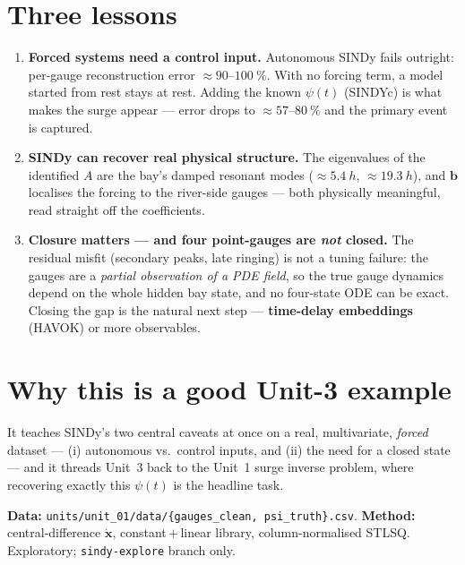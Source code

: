 \documentclass[11pt]{article}
\begin{document}
\section*{Three lessons}

\begin{enumerate}\itemsep2pt
  \item \textbf{Forced systems need a control input.} Autonomous SINDy fails
        outright: per-gauge reconstruction error $\approx 90$--$\SI{100}{\percent}$.
        With no forcing term, a model started from rest stays at rest. Adding the
        known $\psi(t)$ (SINDYc) is what makes the surge appear --- error drops to
        $\approx 57$--$\SI{80}{\percent}$ and the primary event is captured.
  \item \textbf{SINDy can recover real physical structure.} The eigenvalues of the
        identified $A$ are the bay's damped resonant modes ($\approx\SI{5.4}{h}$,
        $\approx\SI{19.3}{h}$), and $\mathbf{b}$ localises the forcing to the
        river-side gauges --- both physically meaningful, read straight off the
        coefficients.
  \item \textbf{Closure matters --- and four point-gauges are \emph{not} closed.}
        The residual misfit (secondary peaks, late ringing) is not a tuning
        failure: the gauges are a \emph{partial observation of a PDE field}, so the
        true gauge dynamics depend on the whole hidden bay state, and no
        four-state ODE can be exact. Closing the gap is the natural next step ---
        \textbf{time-delay embeddings} (HAVOK) or more observables.
\end{enumerate}

\section*{Why this is a good Unit-3 example}

It teaches SINDy's two central caveats at once on a real, multivariate,
\emph{forced} dataset --- (i) autonomous vs.\ control inputs, and (ii) the need for
a closed state --- and it threads Unit~3 back to the Unit~1 surge inverse problem,
where recovering exactly this $\psi(t)$ is the headline task.

\vspace{0.4cm}
\footnotesize\noindent\textbf{Data:} \texttt{units/unit\_01/data/\{gauges\_clean,
psi\_truth\}.csv}. \quad\textbf{Method:} central-difference $\dot{\mathbf{x}}$,
constant\,$+$\,linear library, column-normalised STLSQ. \quad Exploratory;
\texttt{sindy-explore} branch only.
\end{document}

